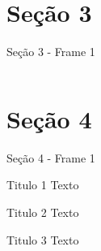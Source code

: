 \documentclass[aspectratio=149]{beamer}
\begin{document}
\section{Seção 3}
	\begin{frame}{Seção 3 - Frame 1}
		\begin{columns}
			\lipsum[1-1]
			
			\lipsum[1-1]
		\end{columns}
	\end{frame}
	
\section{Seção 4}
	\begin{frame}{Seção 4 - Frame 1}
		\begin{block}{Titulo 1}
			Texto
		\end{block}
		
		\begin{alertblock}{Titulo 2}
			Texto
		\end{alertblock}
		
		\begin{exampleblock}{Titulo 3}
			Texto
		\end{exampleblock}
	\end{frame}
\end{document}
